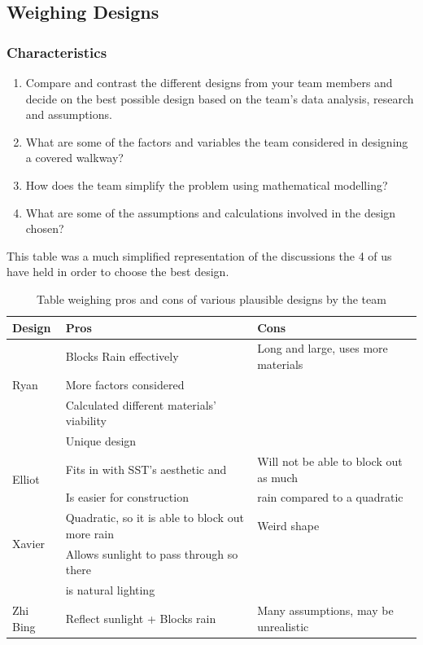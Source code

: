 \documentclass[a4paper,titlepage]{article}
\begin{document}
\pagebreak

\subsection{Weighing Designs}\label{sec:Other Feasible Models:Weighing Designs}

\subsubsection{Characteristics}

\begin{enumerate}
    \item Compare and contrast the different designs from your team members and decide on the best possible design based on the team’s data analysis, research and assumptions.
    \item What are some of the factors and variables the team considered in designing a covered walkway?
    \item How does the team simplify the problem using mathematical modelling?
    \item What are some of the assumptions and calculations involved in the design chosen?
\end{enumerate}

This table was a much simplified representation of the discussions the 4 of us have held in order to choose the best design.

\begin{table}[htbp]
    \centering
    \small
    \setlength\tabcolsep{2pt}
    \begin{tabular}{l|l|l}
        Design & Pros & Cons \\
        \hline
        \multirow{3}{4em}{Ryan} & Blocks Rain effectively  & Long and large, uses more materials \\& More factors considered &\\& Calculated different materials' viability &\\& Unique design &\\
        \hline
        \multirow{2}{4em}{Elliot} & Fits in with SST's aesthetic and & Will not be able to block out as much\\ & Is easier for construction & rain compared to a quadratic\\
        \hline
        \multirow{2}{4em}{Xavier} & Quadratic, so it is able to block out more rain & Weird shape\\  & Allows sunlight to pass through so there \\ &  is natural lighting &\\
        \hline
        Zhi Bing & Reflect sunlight + Blocks rain & Many assumptions, may be unrealistic \\
    \end{tabular}
    \caption{Table weighing pros and cons of various plausible designs by the team}
    \label{tab:prosAndConsOfDifferentDesigns}
\end{table}
\end{document}
